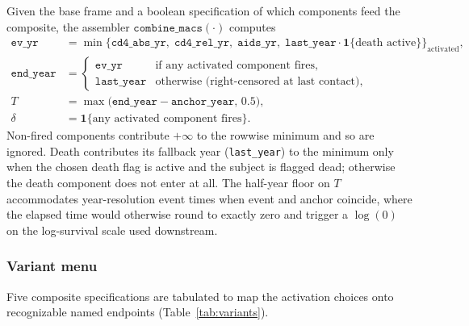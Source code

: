 \documentclass[11pt]{article}
\theoremstyle{plain}
\theoremstyle{definition}
\theoremstyle{remark}
\newcommand{\1}{\mathds{1}}
\begin{document}
Given the base frame and a boolean specification of which components
feed the composite, the assembler $\texttt{combine\_macs}(\cdot)$
computes
\begin{align*}
  \texttt{ev\_yr}
    &= \min \bigl\{
        \texttt{cd4\_abs\_yr},\;
        \texttt{cd4\_rel\_yr},\;
        \texttt{aids\_yr},\;
        \texttt{last\_year} \cdot \mathbf{1}\{\text{death active}\}
      \bigr\}_{\text{activated}} , \\
  \texttt{end\_year}
    &= \begin{cases}
        \texttt{ev\_yr}     & \text{if any activated component fires,} \\
        \texttt{last\_year} & \text{otherwise (right-censored at last contact),}
      \end{cases} \\
  T  &= \max \bigl( \texttt{end\_year} - \texttt{anchor\_year},\, 0.5
       \bigr), \\
  \delta &= \mathbf{1}\{\text{any activated component fires}\}.
\end{align*}
Non-fired components contribute $+\infty$ to the rowwise minimum and so
are ignored. Death contributes its fallback year (\texttt{last\_year})
to the minimum only when the chosen death flag is active and the
subject is flagged dead; otherwise the death component does not enter
at all. The half-year floor on $T$ accommodates year-resolution event
times when event and anchor coincide, where the elapsed time would
otherwise round to exactly zero and trigger a $\log(0)$ on the
log-survival scale used downstream.

\subsubsection*{Variant menu}

Five composite specifications are tabulated to map the activation
choices onto recognizable named endpoints
(Table~\ref{tab:variants}).
\end{document}
